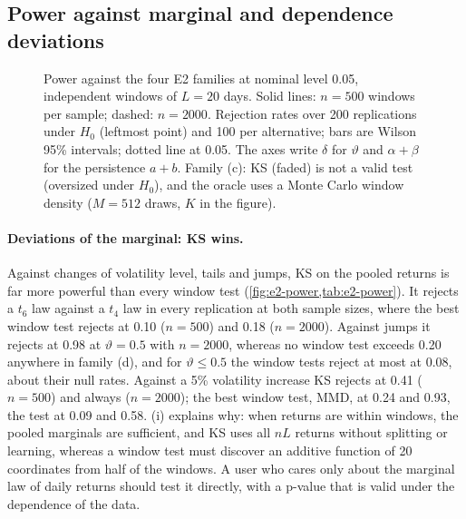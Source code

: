 \subsection{Power against marginal and dependence deviations}\label{sec:sim-power}

\begin{figure}[tbp]
  \centering
  \caption{Power against the four E2 families at nominal level 0.05, independent windows of
    $L=20$ days. Solid lines: $n=500$ windows per sample; dashed: $n=2000$. Rejection rates over
    200 replications under $H_0$ (leftmost point) and 100 per alternative; bars are Wilson 95\%
    intervals; dotted line at 0.05. The axes write $\delta$ for $\vartheta$ and $\alpha+\beta$ for
    the persistence $a+b$. Family (c): KS (faded) is not a valid test (oversized under $H_0$), and
    the oracle uses a Monte Carlo window density ($M=512$ draws, $K$ in the figure).}
  \label{fig:e2-power}
\end{figure}

\begin{table}[tbp]
  \centering
  \caption{Power against the four E2 families: rejection rates at $\alpha=0.05$, independent
    windows of $L=20$ days, $n$ windows per sample, 200 replications at the null level (first row
    of each block) and 100 per alternative. Levels: volatility factor $1+\vartheta$ in (a),
    degrees of freedom $\nu$ of $Q$ in (b), persistence $a+b$ of $Q$ in (c), share $\vartheta$ of
    GBM windows in (d). Wilson 95\% intervals: \cref{tab:e2-power-ci}.}
  \label{tab:e2-power}
  \small
\end{table}

\paragraph{Deviations of the marginal: KS wins.}
Against changes of volatility level, tails and jumps, KS on the pooled returns is far more powerful
than every window test (\cref{fig:e2-power,tab:e2-power}). It rejects a $t_6$ law against a $t_4$
law in every replication at both sample sizes, where the best window test rejects at 0.10 ($n=500$)
and 0.18 ($n=2000$). Against jumps it rejects at 0.98 at $\vartheta=0.5$ with $n=2000$, whereas no
window test exceeds 0.20 anywhere in family (d), and for $\vartheta\le0.5$ the window tests reject
at most at 0.08, about their null rates. Against a 5\% volatility increase KS rejects at 0.41
($n=500$) and always ($n=2000$); the best window test, MMD, at 0.24 and 0.93, the \WC{} test at 0.09
and 0.58. (i) explains why: when returns are \iid{} within windows, the pooled
marginals are sufficient, and KS uses all $nL$ returns without splitting or learning, whereas a
window test must discover an additive function of 20 coordinates from half of the windows. A user
who cares only about the marginal law of daily returns should test it directly, with a p-value that
is valid under the dependence of the data.

